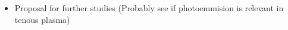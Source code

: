 \begin{itemize}
	\item Proposal for further studies (Probably see if photoemmision is relevant in tenous plasma)
\end{itemize}
